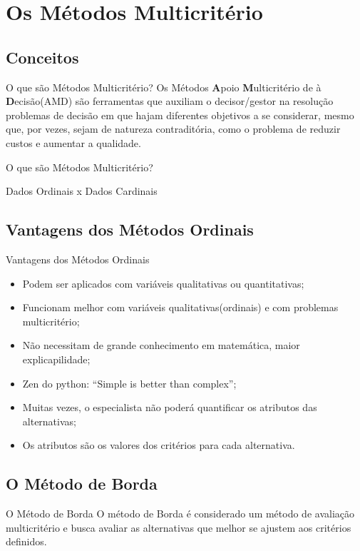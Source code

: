 \documentclass[aspectratio=169]{beamer}
\begin{document}
\section{Os Métodos Multicritério}
\subsection{Conceitos}
\begin{frame}{O que são Métodos Multicritério?}
    Os Métodos \textbf{A}poio \textbf{M}ulticritério de à \textbf{D}ecisão(AMD) são ferramentas que auxiliam o decisor/gestor na resolução problemas de decisão em que hajam diferentes objetivos a se considerar, mesmo que, por vezes, sejam de natureza contraditória, como o problema de reduzir custos e aumentar a qualidade. \cite{Almeida2011}
\end{frame}


\begin{frame}{O que são Métodos Multicritério?}
    \begin{block}{}
        Dados Ordinais x Dados Cardinais
    \end{block}
\end{frame}


\subsection{Vantagens dos Métodos Ordinais}
\begin{frame}{Vantagens dos Métodos Ordinais}
    \begin{itemize}
\item Podem ser aplicados com variáveis qualitativas ou quantitativas;
\item Funcionam melhor com variáveis qualitativas(ordinais) e com problemas multicritério;
\item Não necessitam de grande conhecimento em matemática, maior explicapilidade;
\item Zen do python: “Simple is better than complex”;
\item Muitas vezes, o especialista não poderá quantificar os atributos das alternativas;
\item Os atributos são os valores dos critérios para cada alternativa.
    \end{itemize}
\end{frame}

\subsection{O Método de Borda}
\begin{frame}{O Método de Borda}
    O método de Borda é considerado um método de avaliação multicritério e busca avaliar as alternativas que melhor se ajustem aos critérios definidos. \cite{Barros2020}
\end{frame}
\end{document}
